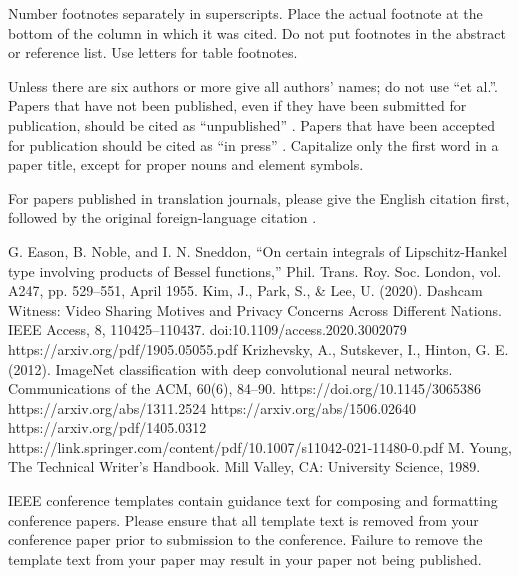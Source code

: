\documentclass[conference]{IEEEtran}
\begin{document}
Number footnotes separately in superscripts. Place the actual footnote at 
the bottom of the column in which it was cited. Do not put footnotes in the 
abstract or reference list. Use letters for table footnotes.

Unless there are six authors or more give all authors' names; do not use 
``et al.''. Papers that have not been published, even if they have been 
submitted for publication, should be cited as ``unpublished'' \cite{b4}. Papers 
that have been accepted for publication should be cited as ``in press'' \cite{b5}. 
Capitalize only the first word in a paper title, except for proper nouns and 
element symbols.

For papers published in translation journals, please give the English 
citation first, followed by the original foreign-language citation \cite{b6}.

\begin{thebibliography}{00}
 G. Eason, B. Noble, and I. N. Sneddon, ``On certain integrals of Lipschitz-Hankel type involving products of Bessel functions,'' Phil. Trans. Roy. Soc. London, vol. A247, pp. 529--551, April 1955.
 Kim, J., Park, S., \& Lee, U. (2020). Dashcam Witness: Video Sharing Motives and Privacy Concerns Across Different Nations. IEEE Access, 8, 110425–110437. doi:10.1109/access.2020.3002079 
 https://arxiv.org/pdf/1905.05055.pdf
 Krizhevsky, A., Sutskever, I., Hinton, G. E. (2012). ImageNet classification with deep convolutional neural networks. Communications of the ACM, 60(6), 84–90. https://doi.org/10.1145/3065386
 https://arxiv.org/abs/1311.2524
 https://arxiv.org/abs/1506.02640
 https://arxiv.org/pdf/1405.0312
 https://link.springer.com/content/pdf/10.1007/s11042-021-11480-0.pdf
 M. Young, The Technical Writer's Handbook. Mill Valley, CA: University Science, 1989.
\end{thebibliography}
\vspace{12pt}
\color{red}
IEEE conference templates contain guidance text for composing and formatting conference papers. Please ensure that all template text is removed from your conference paper prior to submission to the conference. Failure to remove the template text from your paper may result in your paper not being published.
\end{document}
